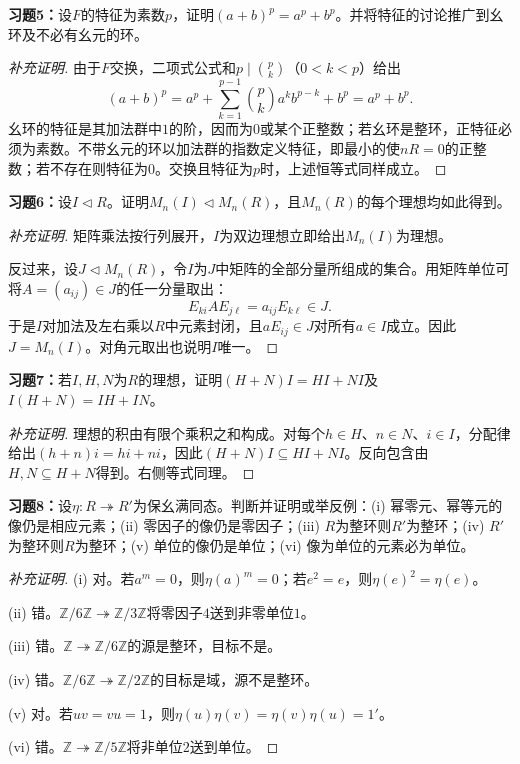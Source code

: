 \begin{problem}
\textbf{习题5：}设$F$的特征为素数$p$，证明$(a+b)^p=a^p+b^p$。并将特征的讨论推广到幺环及不必有幺元的环。
\end{problem}
\begin{proof}[补充证明]
由于$F$交换，二项式公式和$p\mid\binom pk$（$0<k<p$）给出
\[
(a+b)^p=a^p+\sum_{k=1}^{p-1}\binom pk a^kb^{p-k}+b^p=a^p+b^p.
\]
幺环的特征是其加法群中$1$的阶，因而为$0$或某个正整数；若幺环是整环，正特征必须为素数。不带幺元的环以加法群的指数定义特征，即最小的使$nR=0$的正整数；若不存在则特征为$0$。交换且特征为$p$时，上述恒等式同样成立。
\end{proof}

\begin{problem}
\textbf{习题6：}设$I\lhd R$。证明$M_n(I)\lhd M_n(R)$，且$M_n(R)$的每个理想均如此得到。
\end{problem}
\begin{proof}[补充证明]
矩阵乘法按行列展开，$I$为双边理想立即给出$M_n(I)$为理想。

反过来，设$J\lhd M_n(R)$，令$I$为$J$中矩阵的全部分量所组成的集合。用矩阵单位可将$A=(a_{ij})\in J$的任一分量取出：
\[
E_{ki}AE_{j\ell}=a_{ij}E_{k\ell}\in J.
\]
于是$I$对加法及左右乘以$R$中元素封闭，且$aE_{ij}\in J$对所有$a\in I$成立。因此$J=M_n(I)$。对角元取出也说明$I$唯一。
\end{proof}

\begin{problem}
\textbf{习题7：}若$I,H,N$为$R$的理想，证明$(H+N)I=HI+NI$及$I(H+N)=IH+IN$。
\end{problem}
\begin{proof}[补充证明]
理想的积由有限个乘积之和构成。对每个$h\in H$、$n\in N$、$i\in I$，分配律给出$(h+n)i=hi+ni$，因此$(H+N)I\subseteq HI+NI$。反向包含由$H,N\subseteq H+N$得到。右侧等式同理。
\end{proof}

\begin{problem}
\textbf{习题8：}设$\eta:R\twoheadrightarrow R'$为保幺满同态。判断并证明或举反例：(i) 幂零元、幂等元的像仍是相应元素；(ii) 零因子的像仍是零因子；(iii) $R$为整环则$R'$为整环；(iv) $R'$为整环则$R$为整环；(v) 单位的像仍是单位；(vi) 像为单位的元素必为单位。
\end{problem}
\begin{proof}[补充证明]
(i) 对。若$a^m=0$，则$\eta(a)^m=0$；若$e^2=e$，则$\eta(e)^2=\eta(e)$。

(ii) 错。$\mathbb Z/6\mathbb Z\twoheadrightarrow\mathbb Z/3\mathbb Z$将零因子$4$送到非零单位$1$。

(iii) 错。$\mathbb Z\twoheadrightarrow\mathbb Z/6\mathbb Z$的源是整环，目标不是。

(iv) 错。$\mathbb Z/6\mathbb Z\twoheadrightarrow\mathbb Z/2\mathbb Z$的目标是域，源不是整环。

(v) 对。若$uv=vu=1$，则$\eta(u)\eta(v)=\eta(v)\eta(u)=1'$。

(vi) 错。$\mathbb Z\twoheadrightarrow\mathbb Z/5\mathbb Z$将非单位$2$送到单位。
\end{proof}

